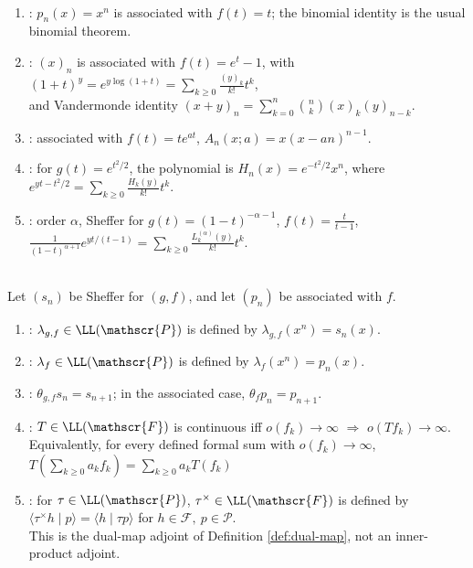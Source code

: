 \begin{example} \label{ex:sheffer-sequence-standard-examples} \\
\begin{enumerate}[label=(\roman*)]
\setlength{\itemsep}{0pt}
\item {}: $p_n(x)=x^n$ is associated with $f(t)=t$; the binomial identity is the usual binomial theorem.
\item {}: $(x)_n$ is associated with $f(t)=e^t-1$, with $(1+t)^y=e^{y\log(1+t)} =\sum\limits_{k\geq0}\frac{(y)_k}{k!}t^k$,\\
and Vandermonde identity $(x+y)_n=\sum\limits_{k=0}^{n}\binom{n}{k}(x)_k(y)_{n-k}$.
\item {}: associated with $f(t)=te^{at}$, $A_n(x;a)=x(x-an)^{n-1}$.
\item {}: for $g(t)=e^{t^2/2}$, the polynomial is $H_n(x)=e^{-t^2/2}x^n$, where $e^{yt-t^2/2}=\sum\limits_{k\geq0}\frac{H_k(y)}{k!}t^k$.
\item {}: order $\alpha$, Sheffer for $g(t)=(1-t)^{-\alpha-1}$, $f(t)=\frac{t}{t-1}$, $\frac{1}{(1-t)^{\alpha+1}}e^{yt/(t-1)} =\sum\limits_{k\geq0}\frac{L_k^{(\alpha)}(y)}{k!}t^k$.
\end{enumerate}
\end{example}

\begin{definition} \label{def:umbral-operator-and-shift}
\label{def:continuous-operators-on-umbral-algebra}
\label{def:operator-adjoint-on-umbral-algebra}
\\
Let $(s_n)$ be Sheffer for $(g,f)$, and let $(p_n)$ be associated with $f$.
\begin{enumerate}[label=(\roman*)]
\setlength{\itemsep}{0pt}
\item {}: $\lambda_{g,f}\in\LL(\mathscr{P})$ is defined by $\lambda_{g,f}(x^n)=s_n(x)$.
\item {}: $\lambda_f\in\LL(\mathscr{P})$ is defined by $\lambda_f(x^n)=p_n(x)$.
\item {}: $\theta_{g,f}s_n=s_{n+1}$; in the associated case, $\theta_fp_n=p_{n+1}$.
\item {}: $T\in\LL(\mathscr{F})$ is continuous iff $o(f_k)\to\infty$ $\Longrightarrow$ $o(Tf_k)\to\infty$.\\
Equivalently, for every defined formal sum with $o(f_k)\to\infty$, $T\left(\sum\limits_{k\geq0}a_kf_k\right) =\sum\limits_{k\geq0}a_kT(f_k)$
\item {}: for $\tau\in\LL(\mathscr{P})$, $\tau^\times\in\LL(\mathscr{F})$ is defined by $\langle \tau^\times h\mid p\rangle =\langle h\mid \tau p\rangle$ for $h\in\mathscr{F},\ p\in\mathscr{P}$.\\
This is the dual-map adjoint of Definition \ref{def:dual-map}, not an inner-product adjoint.
\end{enumerate}
\end{definition}


